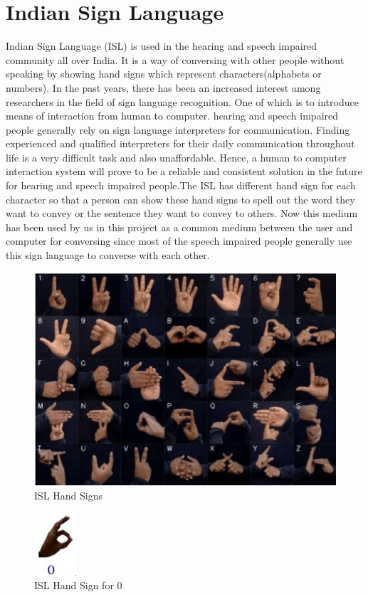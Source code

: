 \documentclass[12pt,a4paper]{report}
\begin{document}
\section{Indian Sign Language}
Indian Sign Language (ISL) is used in the hearing and speech impaired community all over India. It is a way of conversing with other people without speaking by showing hand signs which represent characters(alphabets or numbers). In the past years, there has been an increased interest among researchers in the field of sign language recognition. One of which is to introduce means of interaction from human to computer. hearing and speech impaired people generally rely on sign language interpreters for communication. Finding experienced and qualified interpreters for their daily communication throughout life is a very difficult task and also unaffordable. Hence, a human to computer interaction system will prove to be a reliable and consistent solution in the future for hearing and speech impaired people.The ISL has different hand sign for each character so that a person can show these hand signs to spell out the word they want to convey or the sentence they want to convey to others. Now this medium has been used by us in this project as a common medium between the user and computer for conversing since most of the speech impaired people generally use this sign language to converse with each other.
\begin{figure}[htbp]
	\centerline{\includegraphics[scale=1]{isl.png}}
	\caption{ISL Hand Signs}
	\label{Isl}
\end{figure}
\begin{figure}[htbp]
	\centerline{\includegraphics[scale=1]{isl_0.png}}
	\caption{ISL Hand Sign for 0}
	\label{Isl0}
\end{figure}
\end{document}
